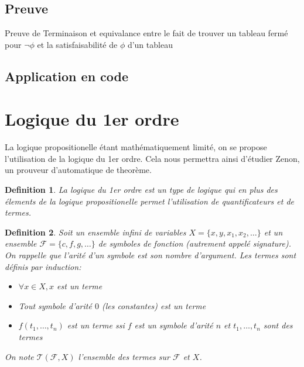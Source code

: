 \documentclass{paper}
\newtheorem{defi}{Definition}
\begin{document}
\subsection{Preuve}
Preuve de Terminaison et equivalance entre le fait de trouver un tableau fermé pour $\lnot\phi$ et la satisfaisabilité de $\phi$ d'un tableau

\subsection{Application en code}





\section{Logique du 1er ordre}
La logique propositionelle étant mathématiquement limité, on se propose l'utilisation de la logique du 1er ordre.
Cela nous permettra ainsi d'étudier Zenon, un prouveur d'automatique de theorème.
\begin{defi}
    La \textit{logique du 1er ordre} est un type de logique qui en plus des élements de la logique propositionelle permet l'utilisation de
    quantificateurs et de \textit{termes}.
\end{defi}

\begin{defi}
    Soit un ensemble infini de variables $X = \{x,y,x_1,x_2,\dots \}$ et un ensemble $\mathcal{F}=\{c,f,g,\dots \}$ de symboles de fonction (autrement appelé signature).
    On rappelle que l'arité d'un symbole est son nombre d'argument.
    Les termes sont définis par induction:
    \begin{itemize}
        \item $\forall x\in X, x$ est un terme
        \item Tout symbole d'arité $0$ (les constantes) est un terme
        \item $f(t_1,\dots,t_n)$ est un terme ssi $f$ est un symbole d'arité $n$ et $t_1,\dots,t_n$ sont des termes
    \end{itemize} 
    On note $\mathcal{T}(\mathcal{F}, X)$ l'ensemble des termes sur $\mathcal{F}$ et $X$.
\end{defi}
\end{document}
